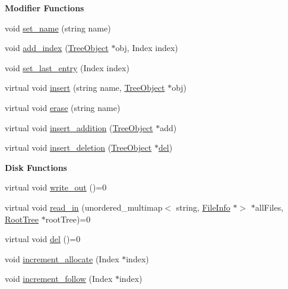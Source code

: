 \begin{Indent}\textbf{ Modifier Functions}\par
\begin{DoxyCompactItemize}
\item 
void \mbox{\hyperlink{class_tree_object_a8ae7e42502b4652102e0b3c4c4e1671b}{set\+\_\+name}} (string name)
\item 
void \mbox{\hyperlink{class_tree_object_af908239ff96a0f3064d0d8aefb58381b}{add\+\_\+index}} (\mbox{\hyperlink{class_tree_object}{Tree\+Object}} $\ast$obj, Index index)
\item 
void \mbox{\hyperlink{class_tree_object_a2ec94bc9d2647275049ddf2a70b8510e}{set\+\_\+last\+\_\+entry}} (Index index)
\item 
virtual void \mbox{\hyperlink{class_tree_object_af8cc57edba9f435b52ccf33cfbbb2fc6}{insert}} (string name, \mbox{\hyperlink{class_tree_object}{Tree\+Object}} $\ast$obj)
\item 
virtual void \mbox{\hyperlink{class_tree_object_a453b5df2a9ef7c6faad259900d574ee2}{erase}} (string name)
\item 
virtual void \mbox{\hyperlink{class_tree_object_a41ce6080e0df5adcea4b0a76d35af885}{insert\+\_\+addition}} (\mbox{\hyperlink{class_tree_object}{Tree\+Object}} $\ast$add)
\item 
virtual void \mbox{\hyperlink{class_tree_object_afcc4b3928d2b77ff080aa229a9706215}{insert\+\_\+deletion}} (\mbox{\hyperlink{class_tree_object}{Tree\+Object}} $\ast$\mbox{\hyperlink{class_tree_object_af390b7479aa972888e594c07a85740b6}{del}})
\end{DoxyCompactItemize}
\end{Indent}
\begin{Indent}\textbf{ Disk Functions}\par
\begin{DoxyCompactItemize}
\item 
virtual void \mbox{\hyperlink{class_tree_object_a63708d61353d83e3e03597394bb7aca0}{write\+\_\+out}} ()=0
\item 
virtual void \mbox{\hyperlink{class_tree_object_a722eb00e6782626281afc8eff92840a4}{read\+\_\+in}} (unordered\+\_\+multimap$<$ string, \mbox{\hyperlink{class_file_info}{File\+Info}} $\ast$$>$ $\ast$all\+Files, \mbox{\hyperlink{class_root_tree}{Root\+Tree}} $\ast$root\+Tree)=0
\item 
virtual void \mbox{\hyperlink{class_tree_object_af390b7479aa972888e594c07a85740b6}{del}} ()=0
\item 
void \mbox{\hyperlink{class_tree_object_a6b6f0a5c23577748b489652013fa1728}{increment\+\_\+allocate}} (Index $\ast$index)
\item 
void \mbox{\hyperlink{class_tree_object_a86fbde9e7ee245385bf7ca7a8f355bd0}{increment\+\_\+follow}} (Index $\ast$index)
\end{DoxyCompactItemize}
\end{Indent}
